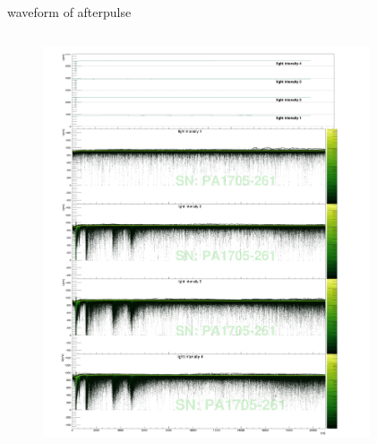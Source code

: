\documentclass[11pt,compress,xcolor=x11names,UTF8]{beamer}
\begin{document}
\begin{frame}{waveform of afterpulse}
\vspace{-1.3cm}
\begin{columns}
\begin{column}{.485\textwidth}
\begin{figure}
\centering
	\includegraphics[width=1.049\textwidth]{figure/PA1705-261_avewave}
\end{figure}
\end{column}
\begin{column}{.485\textwidth}
\begin{figure}
\centering

\end{figure}
\end{column}
\end{columns}
\end{frame}
\end{document}
